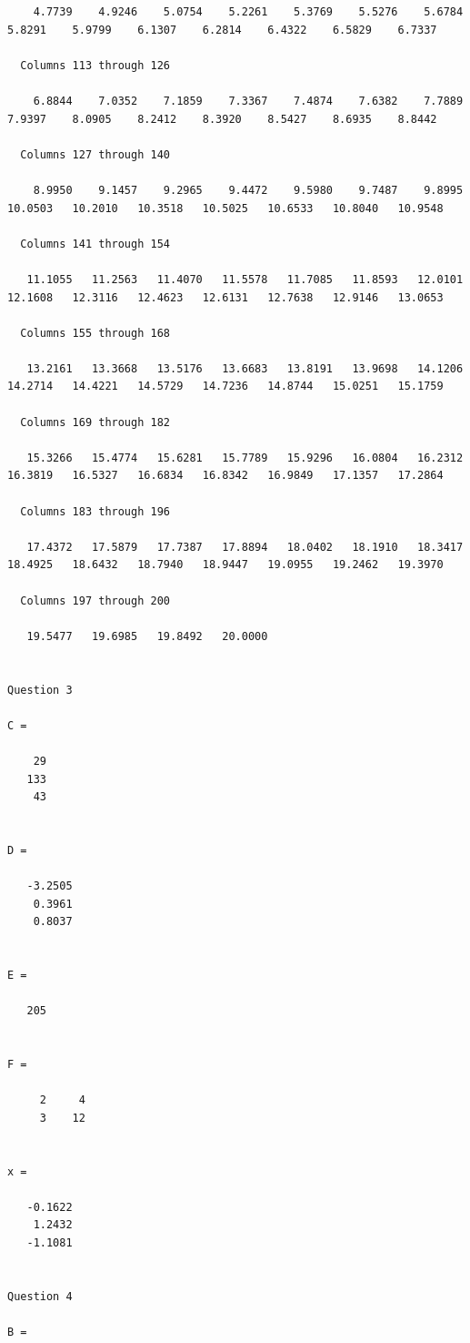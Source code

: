 \documentclass[12pt]{article}
\begin{document}
\begin{verbatim}
    4.7739    4.9246    5.0754    5.2261    5.3769    5.5276    5.6784    5.8291    5.9799    6.1307    6.2814    6.4322    6.5829    6.7337

  Columns 113 through 126

    6.8844    7.0352    7.1859    7.3367    7.4874    7.6382    7.7889    7.9397    8.0905    8.2412    8.3920    8.5427    8.6935    8.8442

  Columns 127 through 140

    8.9950    9.1457    9.2965    9.4472    9.5980    9.7487    9.8995   10.0503   10.2010   10.3518   10.5025   10.6533   10.8040   10.9548

  Columns 141 through 154

   11.1055   11.2563   11.4070   11.5578   11.7085   11.8593   12.0101   12.1608   12.3116   12.4623   12.6131   12.7638   12.9146   13.0653

  Columns 155 through 168

   13.2161   13.3668   13.5176   13.6683   13.8191   13.9698   14.1206   14.2714   14.4221   14.5729   14.7236   14.8744   15.0251   15.1759

  Columns 169 through 182

   15.3266   15.4774   15.6281   15.7789   15.9296   16.0804   16.2312   16.3819   16.5327   16.6834   16.8342   16.9849   17.1357   17.2864

  Columns 183 through 196

   17.4372   17.5879   17.7387   17.8894   18.0402   18.1910   18.3417   18.4925   18.6432   18.7940   18.9447   19.0955   19.2462   19.3970

  Columns 197 through 200

   19.5477   19.6985   19.8492   20.0000


Question 3

C =

    29
   133
    43


D =

   -3.2505
    0.3961
    0.8037


E =

   205


F =

     2     4
     3    12


x =

   -0.1622
    1.2432
   -1.1081


Question 4

B =


\end{verbatim}
\end{document}
